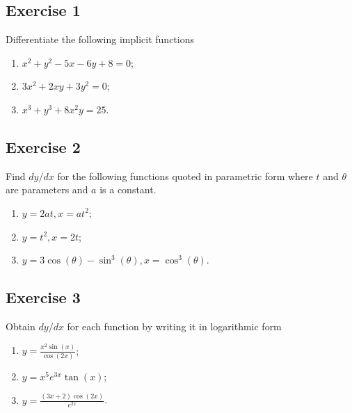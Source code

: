 \documentclass[
  english,
  11pt,
  oneside]{book}
\providecommand{\tightlist}{%
  \setlength{\itemsep}{0pt}\setlength{\parskip}{0pt}}
\newcommand{\slide}{}
\theoremstyle{definition}
\theoremstyle{definition}
\theoremstyle{definition}
\theoremstyle{definition}
\theoremstyle{remark}
\begin{document}
\subsection*{Exercise 1}\label{exercise-1-5}

Differentiate the following implicit functions

\begin{enumerate}
\def\labelenumi{\roman{enumi}.}
\tightlist
\item
  \(x^2+y^2-5x-6y+8=0\);
\item
  \(3x^2+2xy+3y^2=0\);
\item
  \(x^3+y^3+8x^2y=25\).
\end{enumerate}

\slide

\subsection*{Exercise 2}\label{exercise-2-5}

Find \(dy/dx\) for the following functions quoted in parametric form where \(t\) and \(\theta\) are parameters and \(a\) is a constant.

\begin{enumerate}
\def\labelenumi{\roman{enumi}.}
\tightlist
\item
  \(y=2at, x = at^2\);
\item
  \(y=t^2, x = 2t\);
\item
  \(y=3\cos(\theta)-\sin^3(\theta), x = \cos^3(\theta)\).
\end{enumerate}

\slide

\subsection*{Exercise 3}\label{exercise-3-4}

Obtain \(dy/dx\) for each function by writing it in logarithmic form

\begin{enumerate}
\def\labelenumi{\roman{enumi}.}
\tightlist
\item
  \(y=\frac{x^2\sin(x)}{\cos(2x)}\);
\item
  \(y=x^5e^{3x}\tan(x)\);
\item
  \(y=\frac{(3x+2)\cos(2x)}{e^{2x}}\).
\end{enumerate}
\end{document}
